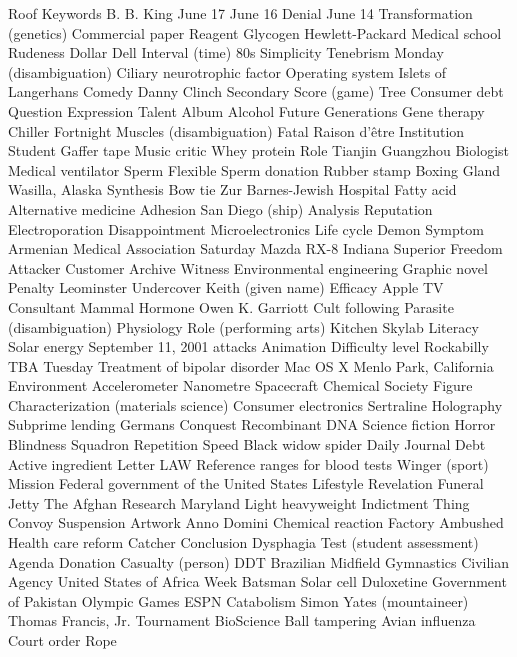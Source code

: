 Roof  Keywords  B. B. King  
June 17  June 16  Denial  
June 14  Transformation (genetics)  Commercial paper  
Reagent  Glycogen  Hewlett-Packard  
Medical school  Rudeness  Dollar  
Dell  Interval (time)  80s  
Simplicity  Tenebrism  Monday (disambiguation)  
Ciliary neurotrophic factor  Operating system  Islets of Langerhans  
Comedy  Danny Clinch  Secondary  
Score (game)  Tree  Consumer debt  
Question  Expression  Talent  
Album  Alcohol  Future Generations  
Gene therapy  Chiller  Fortnight  
Muscles (disambiguation)  Fatal  Raison d'être  
Institution  Student  Gaffer tape  
Music critic  Whey protein  Role  
Tianjin  Guangzhou  Biologist  
Medical ventilator  Sperm  Flexible  
Sperm donation  Rubber stamp  Boxing  
Gland  Wasilla, Alaska  Synthesis  
Bow tie  Zur  Barnes-Jewish Hospital  
Fatty acid  Alternative medicine  Adhesion  
San Diego (ship)  Analysis  Reputation  
Electroporation  Disappointment  Microelectronics  
Life cycle  Demon  Symptom  
Armenian Medical Association  Saturday  Mazda RX-8  
Indiana  Superior  Freedom  
Attacker  Customer  Archive  
Witness  Environmental engineering  Graphic novel  
Penalty  Leominster  Undercover  
Keith (given name)  Efficacy  Apple TV  
Consultant  Mammal  Hormone  
Owen K. Garriott  Cult following  Parasite (disambiguation)  
Physiology  Role (performing arts)  Kitchen  
Skylab  Literacy  Solar energy  
September 11, 2001 attacks  Animation  Difficulty level  
Rockabilly  TBA  Tuesday  
Treatment of bipolar disorder  Mac OS X  Menlo Park, California  
Environment  Accelerometer  Nanometre  
Spacecraft  Chemical Society  Figure  
Characterization (materials science)  Consumer electronics  Sertraline  
Holography  Subprime lending  Germans  
Conquest  Recombinant DNA  Science fiction  
Horror  Blindness  Squadron  
Repetition  Speed  Black widow spider  
Daily Journal  Debt  Active ingredient  
Letter  LAW  Reference ranges for blood tests  
Winger (sport)  Mission  Federal government of the United States  
Lifestyle  Revelation  Funeral  
Jetty  The Afghan  Research  
Maryland  Light heavyweight  Indictment  
Thing  Convoy  Suspension  
Artwork  Anno Domini  Chemical reaction  
Factory  Ambushed  Health care reform  
Catcher  Conclusion  Dysphagia  
Test (student assessment)  Agenda  Donation  
Casualty (person)  DDT  Brazilian  
Midfield  Gymnastics  Civilian  
Agency  United States of Africa  Week  
Batsman  Solar cell  Duloxetine  
Government of Pakistan  Olympic Games  ESPN  
Catabolism  Simon Yates (mountaineer)  Thomas Francis, Jr.  
Tournament  BioScience  Ball tampering  
Avian influenza  Court order  Rope  
